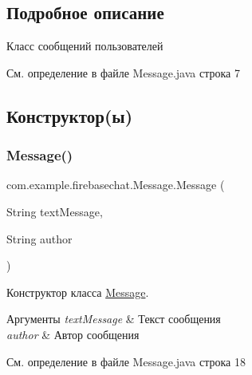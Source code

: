 \subsection{Подробное описание}
Класс сообщений пользователей 

См. определение в файле Message.\+java строка 7



\subsection{Конструктор(ы)}
\mbox{\label{classcom_1_1example_1_1firebasechat_1_1_message_a16d2a1e81245c95a65287af20c897bcf}} 
\subsubsection{\texorpdfstring{Message()}{Message()}\hspace{0.1cm}{\footnotesize\ttfamily [1/2]}}
{\footnotesize\ttfamily com.\+example.\+firebasechat.\+Message.\+Message (\begin{DoxyParamCaption}\item[{String}]{text\+Message,  }\item[{String}]{author }\end{DoxyParamCaption})}



Конструктор класса \mbox{\hyperlink{classcom_1_1example_1_1firebasechat_1_1_message}{Message}}. 


\begin{DoxyParams}{Аргументы}
{\em text\+Message} & Текст сообщения \\
\hline
{\em author} & Автор сообщения \\
\hline
\end{DoxyParams}


См. определение в файле Message.\+java строка 18

\mbox{\label{classcom_1_1example_1_1firebasechat_1_1_message_a6693707a10383562d63555ee5014a9aa}} 
